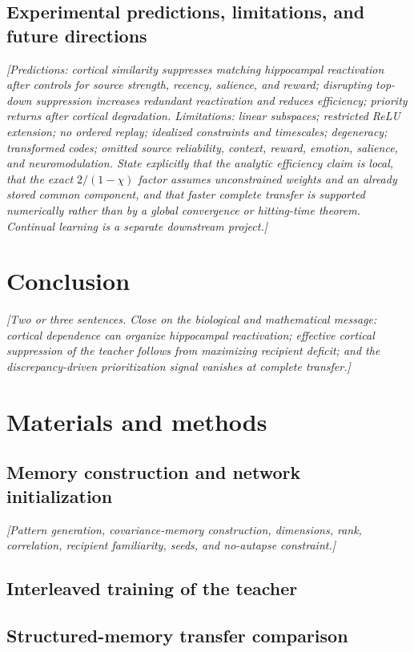 \documentclass[10pt,letterpaper]{article}
\theoremstyle{plain}
\theoremstyle{remark}
\begin{document}
\subsection{Experimental predictions, limitations, and future directions}
\textit{[Predictions: cortical similarity suppresses matching hippocampal reactivation after controls for source strength, recency, salience, and reward; disrupting top-down suppression increases redundant reactivation and reduces efficiency; priority returns after cortical degradation. Limitations: linear subspaces; restricted ReLU extension; no ordered replay; idealized constraints and timescales; degeneracy; transformed codes; omitted source reliability, context, reward, emotion, salience, and neuromodulation. State explicitly that the analytic efficiency claim is local, that the exact $2/(1-\chi)$ factor assumes unconstrained weights and an already stored common component, and that faster complete transfer is supported numerically rather than by a global convergence or hitting-time theorem. Continual learning is a separate downstream project.]}

\section{Conclusion}
\textit{[Two or three sentences. Close on the biological and mathematical message: cortical dependence can organize hippocampal reactivation; effective cortical suppression of the teacher follows from maximizing recipient deficit; and the discrepancy-driven prioritization signal vanishes at complete transfer.]}

\section{Materials and methods}

\subsection{Memory construction and network initialization}
\textit{[Pattern generation, covariance-memory construction, dimensions, rank, correlation, recipient familiarity, seeds, and no-autapse constraint.]}

\subsection{Interleaved training of the teacher}

\subsection{Structured-memory transfer comparison}
\label{sec:methods-fast-transfer}
\end{document}
